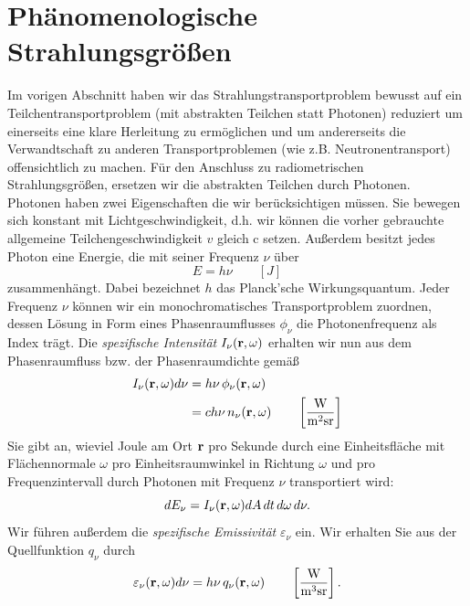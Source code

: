 	\section{Phänomenologische Strahlungsgrößen}\label{subsec:strahlungsgroessen}
	Im vorigen Abschnitt haben wir das Strahlungstransportproblem bewusst auf ein Teilchentransportproblem (mit abstrakten Teilchen statt Photonen) reduziert um einerseits eine klare Herleitung zu ermöglichen und um andererseits die Verwandtschaft zu anderen Transportproblemen (wie z.B. Neutronentransport) offensichtlich zu machen. Für den Anschluss zu radiometrischen Strahlungsgrößen, ersetzen wir die abstrakten Teilchen durch Photonen. Photonen haben zwei Eigenschaften die wir berücksichtigen müssen. Sie bewegen sich konstant mit Lichtgeschwindigkeit, d.h. wir können die vorher gebrauchte allgemeine Teilchengeschwindigkeit $v$ gleich $\text{c}$ setzen. Außerdem besitzt jedes Photon eine Energie, die mit seiner Frequenz $\nu$ über 
	$$E=h\nu \qquad[J]$$
	zusammenhängt. Dabei bezeichnet $h$ das Planck'sche Wirkungsquantum.
	Jeder Frequenz $\nu$ können wir ein monochromatisches Transportproblem zuordnen, dessen Lösung in Form eines Phasenraumflusses $\phi_\nu$ die Photonenfrequenz als Index trägt.
	Die {\em spezifische Intensität} $I_\nu(\mathbf{r},\omega)$ erhalten wir nun aus dem Phasenraumfluss bzw. der Phasenraumdichte gemäß
	\begin{align}\label{eq:intensity_def}
		I_\nu(\mathbf{r},\omega)d\nu & = h\nu\,\phi_\nu(\mathbf{r},\omega)\\
		                       & = c h\nu\,n_\nu(\mathbf{r},\omega) \qquad \left[\frac{\text{W}}{\text{m}^2\text{sr}}\right] \nonumber
	\end{align}
	Sie gibt an, wieviel Joule am Ort $\mathbf{r}$ pro Sekunde durch eine Einheitsfläche mit Flächennormale $\omega$ pro Einheitsraumwinkel in Richtung $\omega$ und pro Frequenzintervall durch Photonen mit Frequenz $\nu$ transportiert wird:
	$$dE_\nu=I_\nu(\mathbf{r},\omega) dA\,dt\,d\omega\,d\nu.$$
	Wir führen außerdem die {\em spezifische Emissivität} $\varepsilon_\nu$ ein. Wir erhalten Sie aus der Quellfunktion $q_\nu$ durch
	\begin{equation}\label{eq:emissivity_def}
		\varepsilon_\nu(\mathbf{r},\omega)d\nu = h\nu\,q_\nu(\mathbf{r},\omega) \qquad \left[\frac{\text{W}}{\text{m}^3\text{sr}}\right].
	\end{equation}
	
